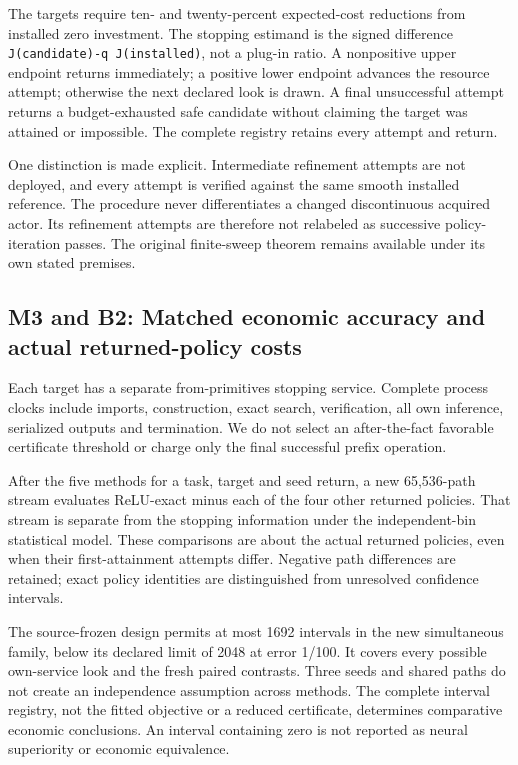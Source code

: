 The targets require ten- and twenty-percent expected-cost reductions
from installed zero investment. The stopping estimand is the signed
difference \texttt{J(candidate)-q\ J(installed)}, not a plug-in ratio. A
nonpositive upper endpoint returns immediately; a positive lower
endpoint advances the resource attempt; otherwise the next declared look
is drawn. A final unsuccessful attempt returns a budget-exhausted safe
candidate without claiming the target was attained or impossible. The
complete registry retains every attempt and return.

One distinction is made explicit. Intermediate refinement attempts are
not deployed, and every attempt is verified against the same smooth
installed reference. The procedure never differentiates a changed
discontinuous acquired actor. Its refinement attempts are therefore not
relabeled as successive policy-iteration passes. The original
finite-sweep theorem remains available under its own stated premises.

\hypertarget{m3-and-b2-matched-economic-accuracy-and-actual-returned-policy-costs}{%
\subsection{M3 and B2: Matched economic accuracy and actual
returned-policy
costs}\label{m3-and-b2-matched-economic-accuracy-and-actual-returned-policy-costs}}

Each target has a separate from-primitives stopping service. Complete
process clocks include imports, construction, exact search,
verification, all own inference, serialized outputs and termination. We
do not select an after-the-fact favorable certificate threshold or
charge only the final successful prefix operation.

After the five methods for a task, target and seed return, a new
65,536-path stream evaluates ReLU-exact minus each of the four other
returned policies. That stream is separate from the stopping information
under the independent-bin statistical model. These comparisons are about
the actual returned policies, even when their first-attainment attempts
differ. Negative path differences are retained; exact policy identities
are distinguished from unresolved confidence intervals.

The source-frozen design permits at most 1692 intervals in the new
simultaneous family, below its declared limit of 2048 at error 1/100. It
covers every possible own-service look and the fresh paired contrasts.
Three seeds and shared paths do not create an independence assumption
across methods. The complete interval registry, not the fitted objective
or a reduced certificate, determines comparative economic conclusions.
An interval containing zero is not reported as neural superiority or
economic equivalence.

